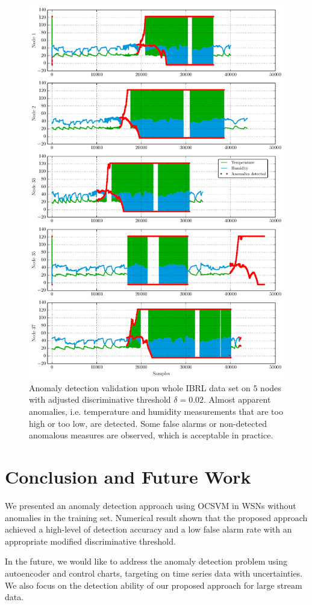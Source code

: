 \documentclass[conference]{IEEEtran}
\begin{document}
\begin{figure}
\centering
\includegraphics[scale=.4]{Python/time_validation.pdf}
\caption{Anomaly detection validation upon whole IBRL data set on $5$ nodes with adjusted discriminative threshold $\delta=0.02$. Almost apparent anomalies, i.e. temperature and humidity measurements that are too high or too low, are detected. Some false alarms or non-detected anomalous measures are observed, which is acceptable in practice.}
\label{fig:time_valid}
\end{figure}

\section{Conclusion and Future Work}\label{sec:concluding}

We presented an anomaly detection approach using OCSVM in WSNs without anomalies in the training set. Numerical result shown that the proposed approach achieved a high-level of detection accuracy and a low false alarm rate with an appropriate modified  discriminative threshold.  

In the future, we would like to address the anomaly detection problem using autoencoder and control charts, targeting on time series data with uncertainties. We also focus on the detection ability of our proposed approach for large stream data.



\end{document}
